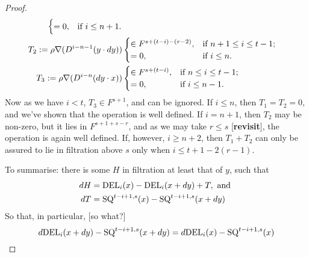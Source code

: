 \documentclass[11pt]{amsart}
\theoremstyle{plain}
\theoremstyle{definition}
\theoremstyle{plain}
\newcommand{\twist}{\omega}
\newcommand{\Nabla}{\nabla}
\begin{document}
\begin{second quadrant homotopy}
\begin{proof}
\begin{align*}
\begin{cases}
=0,&\textup{if }i\leq n+1.
\end{cases}
\\
T_2:=\rho\Nabla(D^{i-n-1}(y\cdot dy))&\begin{cases}
\in F^{s+(t-i)-(r-2)},&\textup{if }n+1\leq i\leq t-1;\\
=0,&\textup{if }i\leq n.
\end{cases}
\\
T_3:=\rho\Nabla(D^{i-n}(dy\cdot x))&\begin{cases}
\in F^{s+(t-i)},&\textup{if }n\leq i\leq t-1;\\
=0,&\textup{if }i\leq n-1.
\end{cases}
\end{align*}
Now as we have $i<t$, $T_3\in F^{s+1}$, and can be ignored. If $i\leq n$, then $T_1=T_2=0$, and we've shown that the operation is well defined. If $i=n+1$, then $T_2$ may be non-zero, but it lies in $F^{s+1+s-r}$, and as we may take $r\leq s$ [\textbf{revisit}], the operation is again well defined.
If, however, $i\geq n+2$, then $T_1+T_2$  can only be assured to lie in filtration above $s$ only when $i\leq t+1-2(r-1)$.

To summarise: there is some $H$ in filtration at least that of $y$, such that
\begin{alignat*}{2}
dH
&=
\textup{DEL}_i(x)-\textup{DEL}_i(x+dy)+T, \textup{ and }%
\\
dT
&=
\textup{SQ}^{t-i+1,s}(x)-\textup{SQ}^{t-i+1,s}(x+dy)
\end{alignat*}
So that, in particular, [so what?]
\[d\textup{DEL}_i(x+dy)-\textup{SQ}^{t-i+1,s}(x+dy)=d\textup{DEL}_i(x)-\textup{SQ}^{t-i+1,s}(x)\qedhere\]
\end{proof}


\end{second quadrant homotopy}
\end{document}

